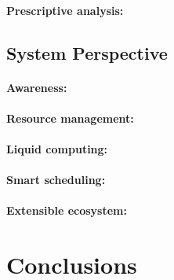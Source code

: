 \documentclass[a4paper, twocolumn]{article}
\begin{document}
\paragraph{Prescriptive analysis:}

\subsection{System Perspective}

\paragraph{Awareness:}
\paragraph{Resource management:}
\paragraph{Liquid computing:}
\paragraph{Smart scheduling:}
\paragraph{Extensible ecosystem:}

\section{Conclusions}
\label{sec:conclusions}
\end{document}
